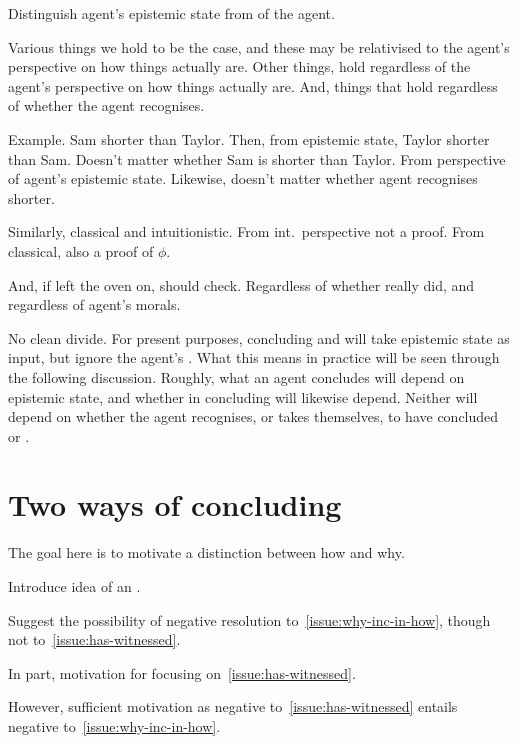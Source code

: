\begin{note}
  Distinguish agent's epistemic state from \stance{} of the agent.

  Various things we hold to be the case, and these may be relativised to the agent's perspective on how things actually are.
  Other things, hold regardless of the agent's perspective on how things actually are.
  And, things that hold regardless of whether the agent recognises.

  Example.
  Sam shorter than Taylor.
  Then, from epistemic state, Taylor shorter than Sam.
  Doesn't matter whether Sam is shorter than Taylor.
  From perspective of agent's epistemic state.
  Likewise, doesn't matter whether agent recognises shorter.

  Similarly, classical and intuitionistic.
  From int.\ perspective not a proof.
  From classical, also a proof of \(\phi\).

  And, if left the oven on, should check.
  Regardless of whether really did, and regardless of agent's morals.

  No clean divide.
  For present purposes, concluding and \csN{} will take epistemic state as input, but ignore the agent's \stance{}.
  What this means in practice will be seen through the following discussion.
  Roughly, what an agent concludes will depend on epistemic state, and whether \csN{} in concluding will likewise depend.
  Neither will depend on whether the agent recognises, or takes themselves, to have concluded or \csVed{}.
\end{note}


\section{Two ways of concluding}
\label{sec:overview:two-types-reasoning}

\begin{note}[Goal]
  The goal here is to motivate a distinction between how and why.

  Introduce idea of an \itp{}.

  Suggest the possibility of negative resolution to~\autoref{issue:why-inc-in-how}, though not to~\autoref{issue:has-witnessed}.

  In part, motivation for focusing on~\autoref{issue:has-witnessed}.

  However, sufficient motivation as negative to~\autoref{issue:has-witnessed} entails negative to~\autoref{issue:why-inc-in-how}.
\end{note}

